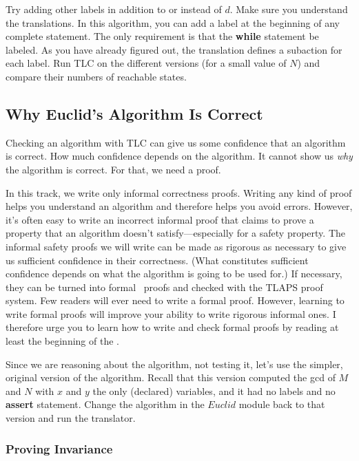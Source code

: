 \documentclass[fleqn,leqno]{article}
\begin{document}
Try adding other labels in addition to or instead of $d$.  Make
sure you understand the translations.  In this algorithm, you can add
a label at the beginning of any complete statement.  The only
requirement is that the \textbf{while} statement be labeled.  As you
have already figured out, the translation defines a subaction for each
label.  Run TLC on the different versions (for a small value of $N$)
and compare their numbers of reachable states.

\subsection{Why Euclid's Algorithm Is Correct} 

Checking an algorithm with TLC can give us some confidence that an
algorithm is correct.  How much confidence depends on the algorithm.
It cannot show us \emph{why} the algorithm is correct.  For that, we
need a proof.

In this track, we write only informal correctness proofs.  Writing any
kind of proof helps you understand an algorithm and therefore helps
you avoid errors.  However, it's often easy to write an incorrect
informal proof that claims to prove a property that an algorithm
doesn't satisfy---especially for a safety property.  The informal
safety proofs we will write can be made as rigorous as necessary to
give us sufficient confidence in their correctness.  (What constitutes
sufficient confidence depends on what the algorithm is going to be
used for.)  If necessary, they can be turned into formal \tlaplus\
proofs and checked with the
TLAPS proof system.  Few readers will ever need to write a formal
proof.  However, learning to write formal proofs will improve your
ability to write rigorous informal ones.  I therefore urge you
to learn how to write and check formal proofs by reading at least the
beginning of the 
 .

Since we are reasoning about the algorithm, not testing it, let's use
the simpler, original version of the algorithm.  Recall that this
version computed the gcd of $M$ and $N$ with $x$ and $y$ the only
(declared) variables, and it had no labels and no \textbf{assert}
statement.  Change the algorithm in the $Euclid$ module back to that
version and run the translator.

\subsubsection{Proving Invariance}  
\end{document}
